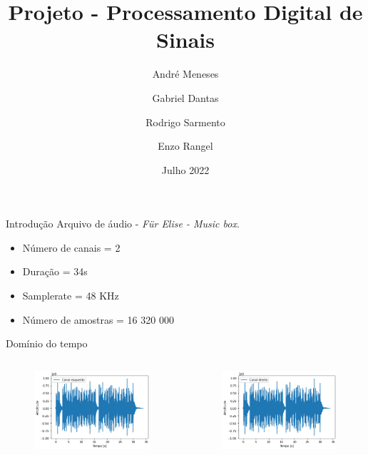 \documentclass{beamer}
\title{Projeto - Processamento Digital de Sinais}
\author{André Meneses \and Gabriel Dantas \and Rodrigo Sarmento \and Enzo Rangel}
\date{Julho 2022}
\begin{document}
\begin{frame}
   \titlepage 
\end{frame}

\begin{frame}{Introdução}
   Arquivo de áudio - \textit{Für Elise - Music box}. \\
   \begin{itemize}
       \item Número de canais = 2
       \item Duração = 34s
       \item Samplerate = 48 KHz
       \item Número de amostras = 16 320 000
   \end{itemize}
\end{frame}

\begin{frame}{Domínio do tempo}
    \begin{columns}
            \begin{figure}
                \centering
                \includegraphics[width = \columnwidth]{elise_frequency.png}
            \end{figure}
            
        \begin{figure}
            \centering
            \includegraphics[width = \columnwidth]{elise_frequency.2png.png}
        \end{figure}
    \end{columns}
\end{frame}
\end{document}
